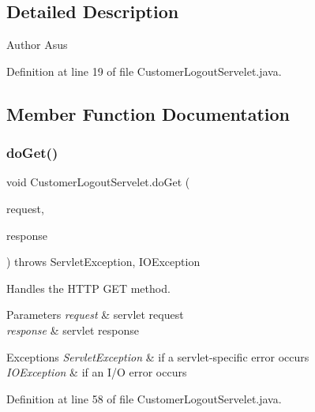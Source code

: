 \subsection{Detailed Description}
\begin{DoxyAuthor}{Author}
Asus 
\end{DoxyAuthor}


Definition at line 19 of file Customer\+Logout\+Servelet.\+java.



\subsection{Member Function Documentation}
\mbox{\label{class_customer_logout_servelet_a72e196fe29f23ff2e9aec1d0537b20a9}} 
\subsubsection{\texorpdfstring{doGet()}{doGet()}}
{\footnotesize\ttfamily void Customer\+Logout\+Servelet.\+do\+Get (\begin{DoxyParamCaption}\item[{Http\+Servlet\+Request}]{request,  }\item[{Http\+Servlet\+Response}]{response }\end{DoxyParamCaption}) throws Servlet\+Exception, I\+O\+Exception\hspace{0.3cm}{\ttfamily [protected]}}

Handles the H\+T\+TP {\ttfamily G\+ET} method.


\begin{DoxyParams}{Parameters}
{\em request} & servlet request \\
\hline
{\em response} & servlet response \\
\hline
\end{DoxyParams}

\begin{DoxyExceptions}{Exceptions}
{\em Servlet\+Exception} & if a servlet-\/specific error occurs \\
\hline
{\em I\+O\+Exception} & if an I/O error occurs \\
\hline
\end{DoxyExceptions}


Definition at line 58 of file Customer\+Logout\+Servelet.\+java.

